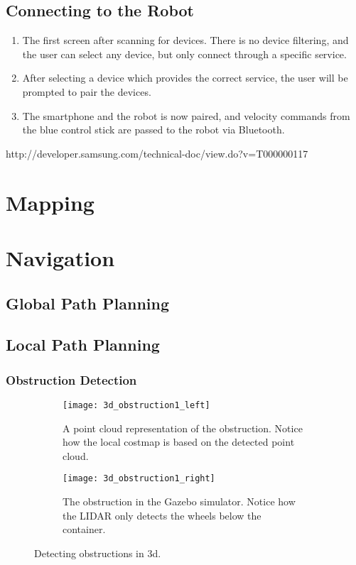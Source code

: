 \subsection{Connecting to the Robot}

\begin{enumerate}
	\item The first screen after scanning for devices. There is no device filtering, and the user can select any device, but only connect through a specific service.
	\item After selecting a device which provides the correct service, the user will be prompted to pair the devices.
	\item The smartphone and the robot is now paired, and velocity commands from the blue control stick are passed to the robot via Bluetooth.
\end{enumerate}

http://developer.samsung.com/technical-doc/view.do?v=T000000117

\section{Mapping}

\section{Navigation}

\subsection{Global Path Planning}

\subsection{Local Path Planning}

\subsubsection{Obstruction Detection}

\begin{figure}
	\centering
	\begin{subfigure}[b]{0.53\textwidth}
		\texttt{[image: 3d\_obstruction1\_left]}
		\caption{A point cloud representation of the obstruction. Notice how the local costmap is based on the detected point cloud.}
		\label{fig:device_select}
	\end{subfigure}
		\begin{subfigure}[b]{0.45\textwidth}
			\texttt{[image: 3d\_obstruction1\_right]}
			\caption{The obstruction in the Gazebo simulator. Notice how the LIDAR only detects the wheels below the container.}
			\label{fig:bt_request}
		\end{subfigure}
	\caption{\label{fig:3d_obstruction1}Detecting obstructions in 3d.}
\end{figure}